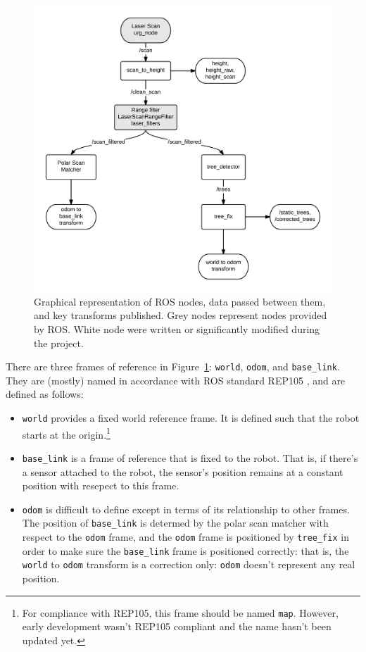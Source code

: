 \documentclass[12pt,oneside,a4paper]{book}
\begin{document}
\begin{figure}[h!]
  \centering
  \includegraphics[width=\textwidth]{figs/roschain}
  \caption{Graphical representation of ROS nodes, data passed between
    them, and key transforms published. Grey nodes represent nodes
    provided by ROS. White node were written or significantly modified
  during the project.}
  \label{fig:roschain}
\end{figure}
\newpage
There are three frames of reference in Figure~\ref{fig:roschain}:
\texttt{world}, \texttt{odom}, and \texttt{base\_link}. They are
(mostly) named in accordance with ROS standard REP105 \cite{rep105},
and are defined as follows:
\begin{itemize}
\item \texttt{world} provides a fixed world reference frame. It is
  defined such that the robot starts at the origin.\footnote{For
    compliance with REP105, this frame should be named
    \texttt{map}. However, early development wasn't REP105 compliant
    and the name hasn't been updated yet.}
\item \texttt{base\_link} is a frame of reference that is fixed to the
  robot. That is, if there's a sensor attached to the robot, the
  sensor's position remains at a constant position with resepect to
  this frame.
\item \texttt{odom} is difficult to define except in terms of its
  relationship to other frames. The position of \texttt{base\_link} is
  determed by the polar scan matcher with respect to the \texttt{odom}
  frame, and the \texttt{odom} frame is positioned by
  \texttt{tree\_fix} in order to make sure the \texttt{base\_link} frame
  is positioned correctly: that is, the \texttt{world} to
  \texttt{odom} transform is a correction only: \texttt{odom} doesn't
  represent any real position.
\end{itemize}
\end{document}
